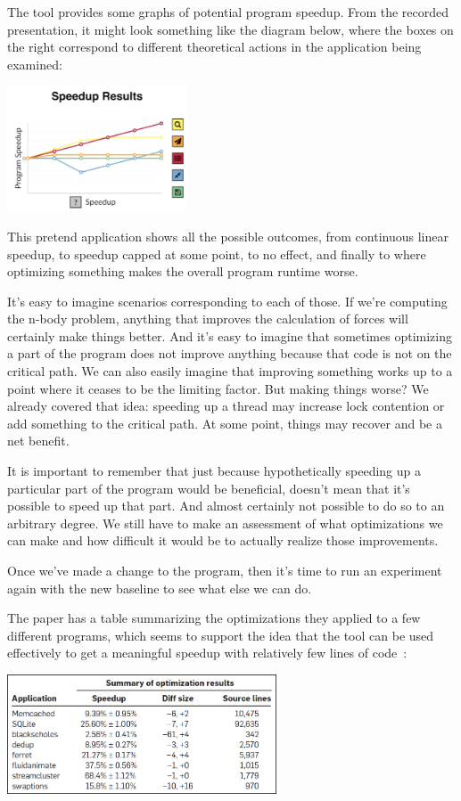\documentclass[a4paper]{report}
\begin{document}
The tool provides some graphs of potential program speedup. From the recorded presentation, it might look something like the diagram below, where the boxes on the right correspond to different theoretical actions in the application being examined:

\begin{center}
	\includegraphics[width=0.4\textwidth]{images/coz-speedup-graph.png}
\end{center}

This pretend application shows all the possible outcomes, from continuous linear speedup, to speedup capped at some point, to no effect, and finally to where optimizing something makes the overall program runtime worse. 

It's easy to imagine scenarios corresponding to each of those. If we're computing the n-body problem, anything that improves the calculation of forces will certainly make things better. And it's easy to imagine that sometimes optimizing a part of the program does not improve anything because that code is not on the critical path. We can also easily imagine that improving something works up to a point where it ceases to be the limiting factor. But making things worse? We already covered that idea: speeding up a thread may increase lock contention or add something to the critical path. At some point, things may recover and be a net benefit.

It is important to remember that just because hypothetically speeding up a particular part of the program would be beneficial, doesn't mean that it's possible to speed up that part. And almost certainly not possible to do so to an arbitrary degree. We still have to make an assessment of what optimizations we can make and how difficult it would be to actually realize those improvements.

Once we've made a change to the program, then it's time to run an experiment again with the new baseline to see what else we can do.

The paper has a table summarizing the optimizations they applied to a few different programs, which seems to support the idea that the tool can be used effectively to get a meaningful speedup with relatively few lines of code~\cite{coz}:
\begin{center}
	\includegraphics[width=0.6\textwidth]{images/coz-speedup.jpg}
\end{center}
\end{document}

